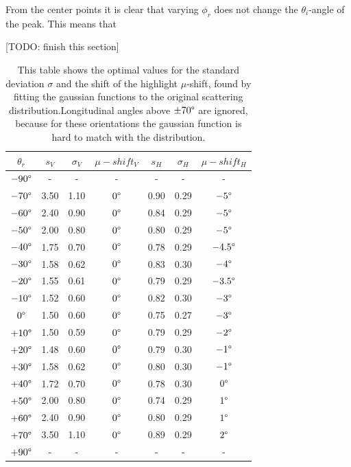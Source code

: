 \documentclass[11pt,a4paper]{report}
\begin{document}
From the center points it is clear that varying $\phi_r$ does not change the $\theta_i$-angle of the peak. This means that 

[TODO: finish this section]



\begin{table}
\begin{center}
\begin{tabular}{c|ccc|ccc|}
$\theta_r$ & $s_V$ & $\sigma_V$ & $\mu-shift_V$ & $s_H$ & $\sigma_H$ & $\mu-shift_H$ \\ \hline
$-90\degree$ & - & - & - & - & - & -\\
$-70\degree$ & 3.50 & 1.10 & $0\degree$ & 0.90 & 0.29 & $-5\degree$ \\

$-60\degree$ & 2.40 & 0.90 & $0\degree$ & 0.84 & 0.29 & $-5\degree$ \\
$-50\degree$ & 2.00 & 0.80 & $0\degree$ & 0.80 & 0.29 & $-5\degree$ \\
$-40\degree$ & 1.75 & 0.70 & $0\degree$ & 0.78 & 0.29 & $-4.5\degree$ \\

$-30\degree$ & 1.58 & 0.62 & $0\degree$ & 0.83 & 0.30 & $-4\degree$ \\
$-20\degree$ & 1.55 & 0.61 & $0\degree$ & 0.79 & 0.29 & $-3.5\degree$ \\
$-10\degree$ & 1.52 & 0.60 & $0\degree$ & 0.82 & 0.30 & $-3\degree$ \\

$0\degree$ & 1.50 & 0.60 & $0\degree$ & 0.75 & 0.27 & $-3\degree$ \\

$+10\degree$ & 1.50 & 0.59 & $0\degree$ & 0.79 & 0.29 & $-2\degree$ \\
$+20\degree$ & 1.48 & 0.60 & $0\degree$ & 0.79 & 0.30 & $-1\degree$ \\
$+30\degree$ & 1.58 & 0.62 & $0\degree$ & 0.80 & 0.30 & $-1\degree$ \\

$+40\degree$ & 1.72 & 0.70 & $0\degree$ & 0.78 & 0.30 & $0\degree$ \\
$+50\degree$ & 2.00 & 0.80 & $0\degree$ & 0.74 & 0.29 & $1\degree$ \\
$+60\degree$ & 2.40 & 0.90 & $0\degree$ & 0.80 & 0.29 & $1\degree$ \\

$+70\degree$ & 3.50 & 1.10 & $0\degree$ & 0.89 & 0.29 & $2\degree$ \\
$+90\degree$ & - & - & - & - & - & - \\
\end{tabular}
\caption{This table shows the optimal values for the standard deviation $\sigma$ and the shift of the highlight $\mu$-shift, found by fitting the gaussian functions to the original scattering distribution.Longitudinal angles above $\pm 70\degree$ are ignored, because for these orientations the gaussian function is hard to match with the distribution.}
\label{directscattering_data}
\end{center}
\end{table}
\end{document}
